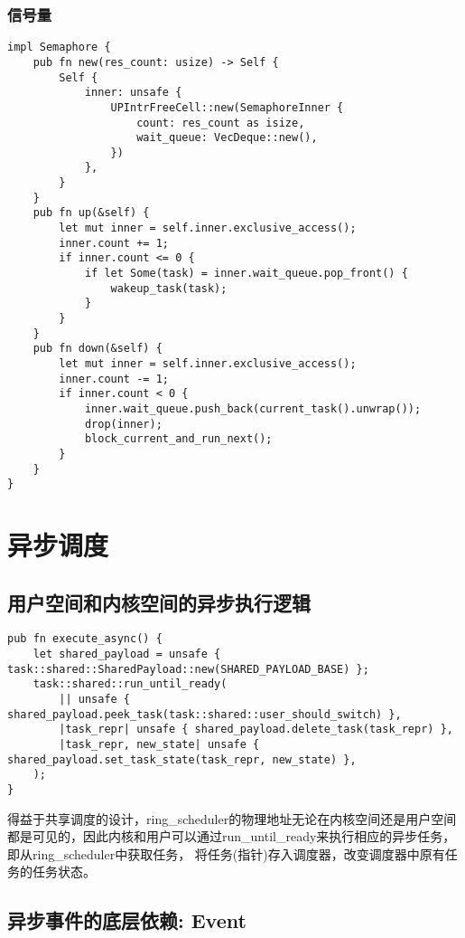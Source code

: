 \subsubsection{信号量}

\begin{lstlisting}[caption=信号量的实现]
impl Semaphore {
    pub fn new(res_count: usize) -> Self {
        Self {
            inner: unsafe {
                UPIntrFreeCell::new(SemaphoreInner {
                    count: res_count as isize,
                    wait_queue: VecDeque::new(),
                })
            },
        }
    }
    pub fn up(&self) {
        let mut inner = self.inner.exclusive_access();
        inner.count += 1;
        if inner.count <= 0 {
            if let Some(task) = inner.wait_queue.pop_front() {
                wakeup_task(task);
            }
        }
    }
    pub fn down(&self) {
        let mut inner = self.inner.exclusive_access();
        inner.count -= 1;
        if inner.count < 0 {
            inner.wait_queue.push_back(current_task().unwrap());
            drop(inner);
            block_current_and_run_next();
        }
    }
}
\end{lstlisting}

\section{异步调度}

\subsection{用户空间和内核空间的异步执行逻辑}

\begin{lstlisting}[caption=用户空间的异步逻辑]
pub fn execute_async() {
    let shared_payload = unsafe { task::shared::SharedPayload::new(SHARED_PAYLOAD_BASE) };
    task::shared::run_until_ready(
        || unsafe { shared_payload.peek_task(task::shared::user_should_switch) },
        |task_repr| unsafe { shared_payload.delete_task(task_repr) },
        |task_repr, new_state| unsafe { shared_payload.set_task_state(task_repr, new_state) },
    );
}
\end{lstlisting}

得益于共享调度的设计，ring\_scheduler的物理地址无论在内核空间还是用户空间都是可见的，因此内核和用户可以通过run\_until\_ready来执行相应的异步任务， 即从ring\_scheduler中获取任务， 将任务(指针)存入调度器，改变调度器中原有任务的任务状态。


\subsection{异步事件的底层依赖: Event}

